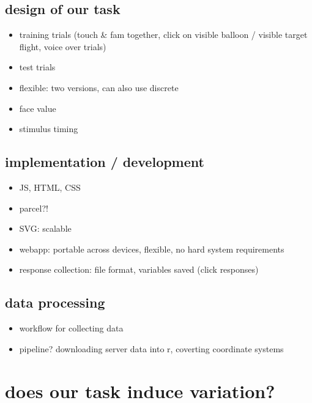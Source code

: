 \documentclass[
  man,floatsintext]{apa6}
\providecommand{\tightlist}{%
  \setlength{\itemsep}{0pt}\setlength{\parskip}{0pt}}
\begin{document}
\hypertarget{design-of-our-task}{%
\subsection{design of our task}\label{design-of-our-task}}

\begin{itemize}
\item
  training trials (touch \& fam together, click on visible balloon / visible target flight, voice over trials)
\item
  test trials
\item
  flexible: two versions, can also use discrete
\item
  face value
\item
  stimulus timing
\end{itemize}

\hypertarget{implementation-development}{%
\subsection{implementation / development}\label{implementation-development}}

\begin{itemize}
\tightlist
\item
  JS, HTML, CSS
\item
  parcel?!
\item
  SVG: scalable
\item
  webapp: portable across devices, flexible, no hard system requirements
\item
  response collection: file format, variables saved (click responses)
\end{itemize}

\hypertarget{data-processing}{%
\subsection{data processing}\label{data-processing}}

\begin{itemize}
\tightlist
\item
  workflow for collecting data
\item
  pipeline? downloading server data into r, coverting coordinate systems
\end{itemize}

\hypertarget{does-our-task-induce-variation}{%
\section{does our task induce variation?}\label{does-our-task-induce-variation}}
\end{document}
